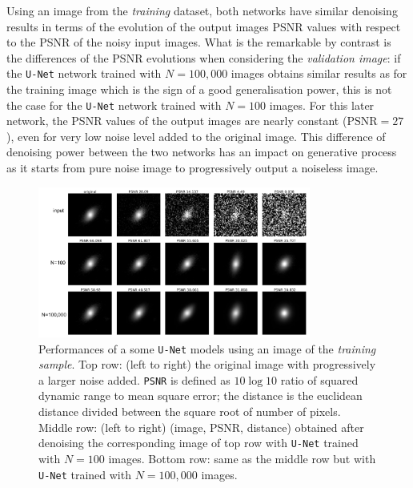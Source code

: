 \documentclass[11pt]{amsart}
\begin{document}
Using an image from the \textit{training} dataset, both networks have similar denoising results in terms of the evolution of the output images  PSNR values with respect to the PSNR of the noisy input images. What is the remarkable by contrast is the differences of the  PSNR evolutions when considering the \textit{validation image}: if the \texttt{U-Net} network trained with $N=100,000$ images obtains similar results as for the training image which is the sign of a good generalisation power, this is  not the case for the \texttt{U-Net} network trained with $N=100$ images. For this later  network, the PSNR values of the output images are nearly constant ($\mathrm{PSNR}=27$), even for very low noise level added to the original image. This difference of denoising power between the two networks has an impact on generative process as it starts from pure noise image to progressively output a noiseless image.
\begin{figure}
    \centering
		\includegraphics[width=0.8\textwidth]{fig-UNet_denoising_train.pdf}
	\caption{Performances of a some \texttt{U-Net} models using an image of the \textit{training sample}. Top row: (left to right) the original image with progressively a larger noise added. \texttt{PSNR} is defined as $10 \log10$ ratio of squared dynamic range
to mean square error; the distance is the euclidean distance divided between the square root of number of pixels. Middle row: (left to right) (image, PSNR, distance) obtained after denoising the corresponding image of top row with \texttt{U-Net} trained with  $N=100$ images. Bottom row: same as the middle row but   with \texttt{U-Net} trained with  $N=100,000$ images.}
	\label{fig-UNet-denoising-train}
\end{figure}
\end{document}
